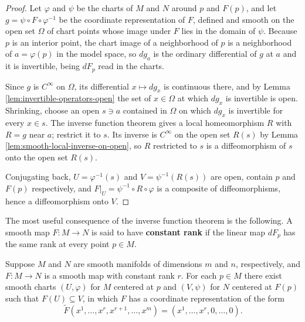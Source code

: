 \begin{proof}
\leanok
{}
Let $\varphi$ and $\psi$ be the charts of $M$ and $N$ around $p$ and $F(p)$, and let $g = \psi \circ F \circ \varphi^{-1}$ be the coordinate representation of $F$, defined and smooth on the open set $\Omega$ of chart points whose image under $F$ lies in the domain of $\psi$. Because $p$ is an interior point, the chart image of a neighborhood of $p$ is a neighborhood of $a = \varphi(p)$ in the model space, so $dg_a$ is the ordinary differential of $g$ at $a$ and it is invertible, being $dF_p$ read in the charts.

Since $g$ is $C^\infty$ on $\Omega$, its differential $x \mapsto dg_x$ is continuous there, and by Lemma \ref{lem:invertible-operators-open} the set of $x \in \Omega$ at which $dg_x$ is invertible is open. Shrinking, choose an open $s \ni a$ contained in $\Omega$ on which $dg_x$ is invertible for every $x \in s$. The inverse function theorem gives a local homeomorphism $R$ with $R = g$ near $a$; restrict it to $s$. Its inverse is $C^\infty$ on the open set $R(s)$ by Lemma \ref{lem:smooth-local-inverse-on-open}, so $R$ restricted to $s$ is a diffeomorphism of $s$ onto the open set $R(s)$.

Conjugating back, $U = \varphi^{-1}(s)$ and $V = \psi^{-1}(R(s))$ are open, contain $p$ and $F(p)$ respectively, and $F|_U = \psi^{-1} \circ R \circ \varphi$ is a composite of diffeomorphisms, hence a diffeomorphism onto $V$.
\end{proof}

The most useful consequence of the inverse function theorem is the following. A smooth map $F: M \to N$ is said to have \textbf{constant rank} if the linear map $dF_p$ has the same rank at every point $p \in M$.

\begin{theorem}
\label{thm:rank-theorem}
Suppose $M$ and $N$ are smooth manifolds of dimensions $m$ and $n$, respectively, and $F: M \to N$ is a smooth map with constant rank $r$. For each $p \in M$ there exist smooth charts $(U, \varphi)$ for $M$ centered at $p$ and $(V, \psi)$ for $N$ centered at $F(p)$ such that $F(U) \subseteq V$, in which $F$ has a coordinate representation of the form
\begin{equation}
\tilde{F}(x^1, \ldots, x^r, x^{r+1}, \ldots, x^m) = (x^1, \ldots, x^r, 0, \ldots, 0). \tag{A.5}
\end{equation}
\end{theorem}

